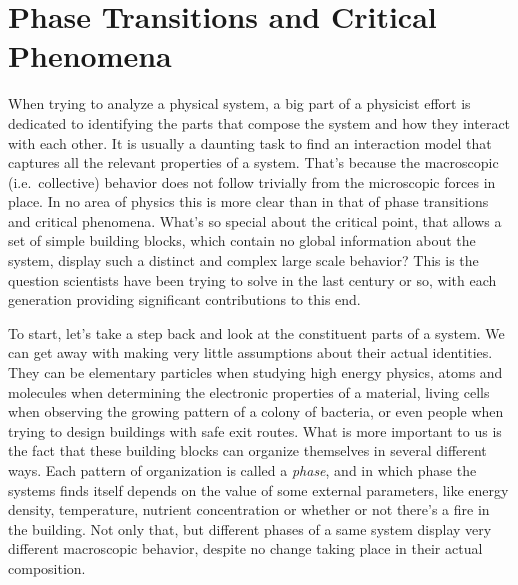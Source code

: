 \chapter{Phase Transitions and Critical Phenomena}
\label{ch:crit}

When trying to analyze a physical system, a big part of a physicist effort is
dedicated to identifying the parts that compose the system and how they
interact with each other. It is usually a daunting task to find an interaction
model that captures all the relevant properties of a system. That's because the
macroscopic (i.e.\ collective) behavior does not follow trivially from the
microscopic forces in place. In no area of physics this is more clear than in
that of phase transitions and critical phenomena. What's so special about the
critical point, that allows a set of simple building blocks, which contain no
global information about the system, display such a distinct and complex large
scale behavior? This is the question scientists have been trying to solve in
the last century or so, with each generation providing significant
contributions to this end.


To start, let's take a step back and look at the constituent parts of a system.
We can get away with making very little assumptions about their actual
identities. They can be elementary particles when studying high energy physics,
atoms and molecules when determining the electronic properties of a material,
living cells when observing the growing pattern of a colony of bacteria, or
even people when trying to design buildings with safe exit routes. What is more
important to us is the fact that these building blocks can organize themselves
in several different ways. Each pattern of organization is called a
\textit{phase}, and in which phase the systems finds itself depends on the
value of some external parameters, like energy density, temperature, nutrient
concentration or whether or not there's a fire in the building. Not only that,
but different phases of a same system display very different macroscopic
behavior, despite no change taking place in their actual composition.

